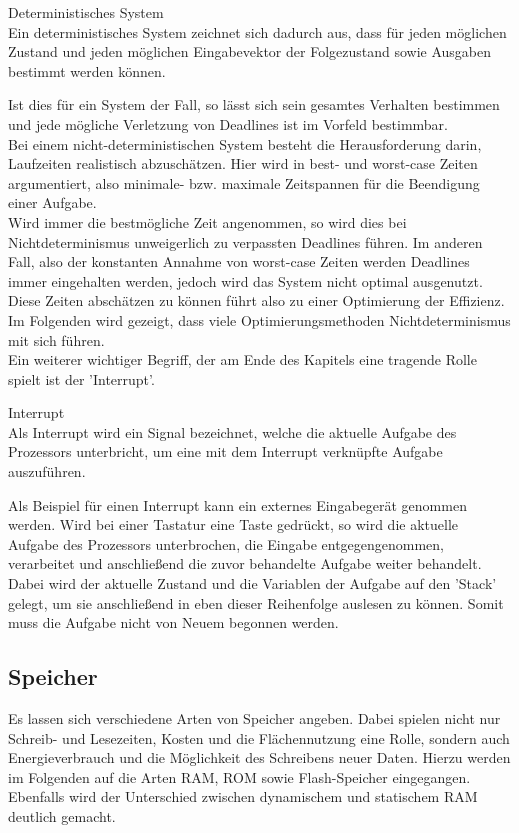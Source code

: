 \begin{definition}{Deterministisches System}\\
Ein deterministisches System zeichnet sich dadurch aus, dass für jeden möglichen Zustand und jeden möglichen Eingabevektor der Folgezustand sowie Ausgaben bestimmt werden können.
\end{definition}
Ist dies für ein System der Fall, so lässt sich sein gesamtes Verhalten bestimmen und jede mögliche Verletzung von Deadlines ist im Vorfeld bestimmbar.\\
Bei einem nicht-deterministischen System besteht die Herausforderung darin, Laufzeiten realistisch abzuschätzen. Hier wird in best- und worst-case Zeiten argumentiert, also minimale- bzw. maximale Zeitspannen für die Beendigung einer Aufgabe.\\
Wird immer die bestmögliche Zeit angenommen, so wird dies bei Nichtdeterminismus unweigerlich zu verpassten Deadlines führen. Im anderen Fall, also der konstanten Annahme von worst-case Zeiten werden Deadlines immer eingehalten werden, jedoch wird das System nicht optimal ausgenutzt. Diese Zeiten abschätzen zu können führt also zu einer Optimierung der Effizienz.\\
Im Folgenden wird gezeigt, dass viele Optimierungsmethoden Nichtdeterminismus mit sich führen.\\
Ein weiterer wichtiger Begriff, der am Ende des Kapitels eine tragende Rolle spielt ist der 'Interrupt'.
\begin{definition}{Interrupt}\\
Als Interrupt wird ein Signal bezeichnet, welche die aktuelle Aufgabe des Prozessors unterbricht, um eine mit dem Interrupt verknüpfte Aufgabe auszuführen.
\end{definition}
Als Beispiel für einen Interrupt kann ein externes Eingabegerät genommen werden. Wird bei einer Tastatur eine Taste gedrückt, so wird die aktuelle Aufgabe des Prozessors unterbrochen, die Eingabe entgegengenommen, verarbeitet und anschließend die zuvor behandelte Aufgabe weiter behandelt. Dabei wird der aktuelle Zustand und die Variablen der Aufgabe auf den 'Stack' gelegt, um sie anschließend in eben dieser Reihenfolge auslesen zu können. Somit muss die Aufgabe nicht von Neuem begonnen werden.
\subsection{Speicher}\label{2.2}
Es lassen sich verschiedene Arten von Speicher angeben. Dabei spielen nicht nur Schreib- und Lesezeiten, Kosten und die Flächennutzung eine Rolle, sondern auch Energieverbrauch und die Möglichkeit des Schreibens neuer Daten. Hierzu werden im Folgenden auf die Arten RAM, ROM sowie Flash-Speicher eingegangen. Ebenfalls wird der Unterschied zwischen dynamischem und statischem RAM deutlich gemacht.

